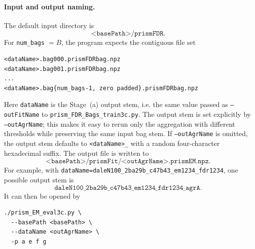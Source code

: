 \documentclass[11pt]{article}
\begin{document}
\paragraph{Input and output naming.}
The default input directory is
\[
\texttt{<basePath>/prismFDR}.
\]
For \texttt{num\_bags} \(=B\), the program expects the contiguous file set
\begin{verbatim}
<dataName>.bag000.prismFDRbag.npz
<dataName>.bag001.prismFDRbag.npz
...
<dataName>.bag{num_bags-1, zero padded}.prismFDRbag.npz
\end{verbatim}
Here \texttt{dataName} is the Stage~(a) output stem, i.e. the same value
passed as \texttt{--outFitName} to \texttt{prism\_FDR\_Bags\_train3c.py}.
The output stem is set explicitly by
\texttt{--outAgrName}; this makes it easy to rerun only the aggregation with
different thresholds while preserving the same input bag stem.
If \texttt{--outAgrName} is omitted, the output stem defaults to
\texttt{<dataName>\_<hash4>} with a random four-character hexadecimal suffix.
The output file is written to
\[
\texttt{<basePath>/prismFit/<outAgrName>.prismEM.npz}.
\]
For example, with
\texttt{dataName=daleN100\_2ba29b\_c47b43\_em1234\_fdr1234}, one possible
output stem is
\[
\texttt{daleN100\_2ba29b\_c47b43\_em1234\_fdr1234\_agrA}.
\]
It can then be opened by
\begin{verbatim}
./prism_EM_eval3c.py \
  --basePath <basePath> \
  --dataName <outAgrName> \
  -p a e f g
\end{verbatim}
\end{document}
